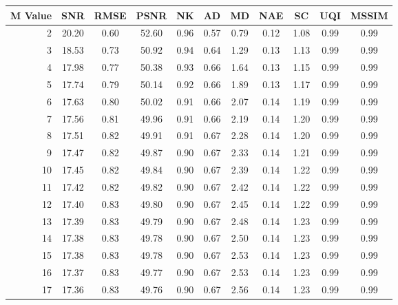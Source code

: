     \begin{table}[htb]
       \small

    \centering 
    \begin{tabular}{|r|cccccccccc|}\hline
   M Value &  SNR &  RMSE &  PSNR &  NK &  AD &  MD &  NAE &  SC &  UQI &  MSSIM \\ \hline 
      2 &  20.20 &  0.60 &  52.60 &  0.96 &  0.57 &  0.79 &  0.12 &  1.08 &  0.99 &  0.99  \\ \hline 
      3 &  18.53 &  0.73 &  50.92 &  0.94 &  0.64 &  1.29 &  0.13 &  1.13 &  0.99 &  0.99  \\ \hline 
      4 &  17.98 &  0.77 &  50.38 &  0.93 &  0.66 &  1.64 &  0.13 &  1.15 &  0.99 &  0.99  \\ \hline 
      5 &  17.74 &  0.79 &  50.14 &  0.92 &  0.66 &  1.89 &  0.13 &  1.17 &  0.99 &  0.99  \\ \hline 
      6 &  17.63 &  0.80 &  50.02 &  0.91 &  0.66 &  2.07 &  0.14 &  1.19 &  0.99 &  0.99  \\ \hline 
      7 &  17.56 &  0.81 &  49.96 &  0.91 &  0.66 &  2.19 &  0.14 &  1.20 &  0.99 &  0.99  \\ \hline 
      8 &  17.51 &  0.82 &  49.91 &  0.91 &  0.67 &  2.28 &  0.14 &  1.20 &  0.99 &  0.99  \\ \hline 
      9 &  17.47 &  0.82 &  49.87 &  0.90 &  0.67 &  2.33 &  0.14 &  1.21 &  0.99 &  0.99  \\ \hline 
      10 &  17.45 &  0.82 &  49.84 &  0.90 &  0.67 &  2.39 &  0.14 &  1.22 &  0.99 &  0.99  \\ \hline 
      11 &  17.42 &  0.82 &  49.82 &  0.90 &  0.67 &  2.42 &  0.14 &  1.22 &  0.99 &  0.99  \\ \hline 
      12 &  17.40 &  0.83 &  49.80 &  0.90 &  0.67 &  2.45 &  0.14 &  1.22 &  0.99 &  0.99  \\ \hline 
      13 &  17.39 &  0.83 &  49.79 &  0.90 &  0.67 &  2.48 &  0.14 &  1.23 &  0.99 &  0.99  \\ \hline 
      14 &  17.38 &  0.83 &  49.78 &  0.90 &  0.67 &  2.50 &  0.14 &  1.23 &  0.99 &  0.99  \\ \hline 
      15 &  17.38 &  0.83 &  49.78 &  0.90 &  0.67 &  2.53 &  0.14 &  1.23 &  0.99 &  0.99  \\ \hline 
      16 &  17.37 &  0.83 &  49.77 &  0.90 &  0.67 &  2.53 &  0.14 &  1.23 &  0.99 &  0.99  \\ \hline 
      17 &  17.36 &  0.83 &  49.76 &  0.90 &  0.67 &  2.56 &  0.14 &  1.23 &  0.99 &  0.99  \\ \hline 

\end{tabular}
\end{table}
